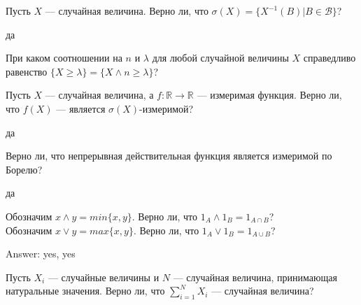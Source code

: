 \begin{problem}
Пусть $X$ — случайная величина. Верно ли, что
$\sigma(X)=\{X^{-1}(B)|B \in \mathcal{B} \}$?

\begin{sol}
да
\end{sol}
\end{problem}

\begin{problem}
При каком соотношении на $n$ и $\lambda$ для любой случайной
величины $X$ справедливо равенство $\{X\ge \lambda\}=\{X\wedge
n\ge\lambda\}$?

\begin{sol}

\end{sol}
\end{problem}

\begin{problem}
Пусть $X$ — случайная величина, а $f:\mathbb{R}\rightarrow
\mathbb{R}$ — измеримая функция.
Верно ли, что $f(X)$ — является $\sigma(X)$-измеримой?

\begin{sol}
да
\end{sol}
\end{problem}

\begin{problem}
Верно ли, что непрерывная действительная функция является
измеримой по Борелю?

\begin{sol}
да
\end{sol}
\end{problem}

\begin{problem}
Обозначим $x \wedge y = min\{x,y\}$. Верно ли, что $1_{A} \wedge
1_{B}=1_{A\cap B}$? \\
Обозначим $x \vee y = max\{x,y\}$. Верно ли, что $1_{A} \vee
1_{B}=1_{A\cup B}$?

\begin{sol}

Answer: yes, yes
\end{sol}
\end{problem}

\begin{problem}
Пусть $X_{i}$ — случайные величины и $N$ — случайная величина,
принимающая натуральные значения. Верно ли, что
$\sum_{i=1}^{N}X_{i}$ — случайная величина?

\begin{sol}

\end{sol}
\end{problem}

